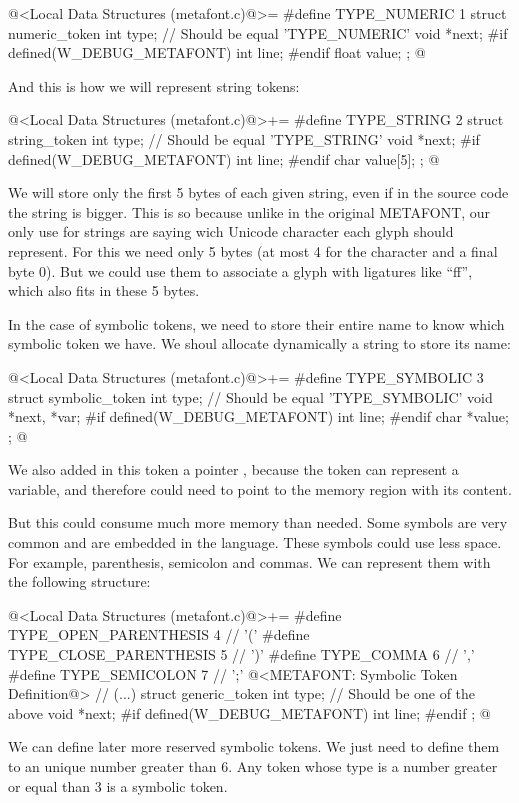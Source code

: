 \iniciocodigo
@<Local Data Structures (metafont.c)@>=
#define TYPE_NUMERIC 1
struct numeric_token{
  int type;   // Should be equal 'TYPE_NUMERIC'
  void *next;
#if defined(W_DEBUG_METAFONT)
  int line;
#endif
  float value;
};
@
\fimcodigo

And this is how we will represent string tokens:

\iniciocodigo
@<Local Data Structures (metafont.c)@>+=
#define TYPE_STRING 2
struct string_token{
  int type;   // Should be equal 'TYPE_STRING'
  void *next;
#if defined(W_DEBUG_METAFONT)
  int line;
#endif
  char value[5];
};
@
\fimcodigo

We will store only the first 5 bytes of each given string, even if in
the source code the string is bigger. This is so because unlike in the
original METAFONT, our only use for strings are saying wich Unicode
character each glyph should represent. For this we need only 5 bytes
(at most 4 for the character and a final byte 0). But we could use
them to associate a glyph with ligatures like ``ff'', which also fits
in these 5 bytes.

In the case of symbolic tokens, we need to store their entire name to
know which symbolic token we have. We shoul allocate dynamically
a string to store its name:

\iniciocodigo
@<Local Data Structures (metafont.c)@>+=
#define TYPE_SYMBOLIC 3
struct symbolic_token{
  int type;   // Should be equal 'TYPE_SYMBOLIC'
  void *next, *var;
#if defined(W_DEBUG_METAFONT)
  int line;
#endif
  char *value;
};
@
\fimcodigo

We also added in this token a pointer , because the
token can represent a variable, and therefore could need to point to
the memory region with its content.

But this could consume much more memory than needed. Some symbols are
very common and are embedded in the language. These symbols could use
less space. For example, parenthesis, semicolon and commas. We can
represent them with the following structure:

\iniciocodigo
@<Local Data Structures (metafont.c)@>+=
#define TYPE_OPEN_PARENTHESIS  4 // '('
#define TYPE_CLOSE_PARENTHESIS 5 // ')'
#define TYPE_COMMA             6 // ','
#define TYPE_SEMICOLON         7 // ';'
@<METAFONT: Symbolic Token Definition@>
// (...)
struct generic_token{
  int type;   // Should be one of the above
  void *next;
#if defined(W_DEBUG_METAFONT)
  int line;
#endif
};
@
\fimcodigo

We can define later more reserved symbolic tokens. We just need to
define them to an unique number greater than 6. Any token whose type
is a number greater or equal than 3 is a symbolic token.

